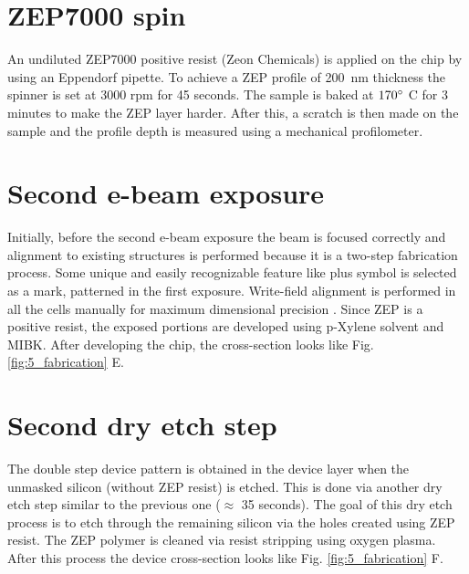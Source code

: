 \documentclass[../report.tex]{subfiles}
\begin{document}
\section{ZEP7000 spin}
An undiluted ZEP7000 positive resist (Zeon Chemicals) is applied on the chip by using an Eppendorf pipette. To achieve a ZEP profile of \SI{200}{\nano \meter} thickness the spinner is set at 3000 rpm for 45 seconds. The sample is baked at $\mathrm{170^{\circ}}$ C for 3 minutes to make the ZEP layer harder. After this, a scratch is then made on the sample and the profile depth is measured using a mechanical profilometer.

\section{Second e-beam exposure}
Initially, before the second e-beam exposure the beam is focused correctly and alignment to existing structures is performed because it is a two-step fabrication process. Some unique and easily recognizable feature like plus symbol is selected as a mark, patterned in the first exposure. Write-field alignment is performed in all the cells manually for maximum dimensional precision \cite{write_field}. Since ZEP is a positive resist, the exposed portions are developed using p-Xylene solvent and MIBK. After developing the chip, the cross-section looks like Fig. \ref{fig:5_fabrication} E.

\section{Second dry etch step}
The double step device pattern is obtained in the device layer when the unmasked silicon (without ZEP resist) is etched. This is done via another dry etch step similar to the previous one ($\approx$ 35 seconds). The goal of this dry etch process is to etch through the remaining silicon via the holes created using ZEP resist. The ZEP polymer is cleaned via resist stripping using oxygen plasma. After this process the device cross-section looks like Fig. \ref{fig:5_fabrication} F. 
\end{document}
